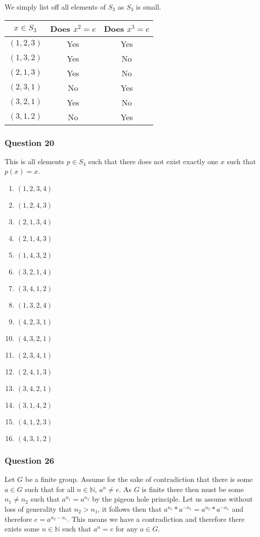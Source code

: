 \documentclass{article}
\begin{document}
We simply list off all elements of $S_3$ as $S_3$ is small.

\begin{tabular}{c|c|c}
	$x\in S_3$ & Does $x^2 = e$ & Does $x^3 = e$ \\
	\hline
	$(1,2,3)$ & Yes & Yes \\
	$(1,3,2)$ & Yes & No \\
	$(2,1,3)$ & Yes & No \\
	$(2,3,1)$ & No & Yes \\
	$(3,2,1)$ & Yes & No \\
	$(3,1,2)$ & No & Yes \\
\end{tabular}

\subsubsection{Question 20}
This is all elements $p\in S_4$ such that there does not exist exactly one $x$ such that $p(x) = x$.
\begin{enumerate}
	\item $(1,2,3,4)$
	\item $(1,2,4,3)$
	\item $(2,1,3,4)$
	\item $(2,1,4,3)$
	\item $(1,4,3,2)$
	\item $(3,2,1,4)$
	\item $(3,4,1,2)$
	\item $(1,3,2,4)$
	\item $(4,2,3,1)$
	\item $(4,3,2,1)$
	\item $(2,3,4,1)$
	\item $(2,4,1,3)$
	\item $(3,4,2,1)$
	\item $(3,1,4,2)$
	\item $(4,1,2,3)$
	\item $(4,3,1,2)$
\end{enumerate}
\subsubsection{Question 26}

Let $G$ be a finite group. Assume for the sake of contradiction that there is some $a\in G$ such that for all $n \in\mathbb N$, $a^n\not= e$. As $G$ is finite there then must be some $n_1\not=n_2$ such that $a^{n_1} = a^{n_2}$ by the pigeon hole principle. Let us assume without loss of generality that $n_2 > n_1$, it follows then that $a^{n_1}*a^{-n_1} = a^{n_2}*a^{-n_1}$ and therefore $e = a^{n_2 - n_1}$. This means we have a contradiction and therefore there exists some $n\in\mathbb N$ such that $a^n=e$ for any $a \in G$.
\end{document}
